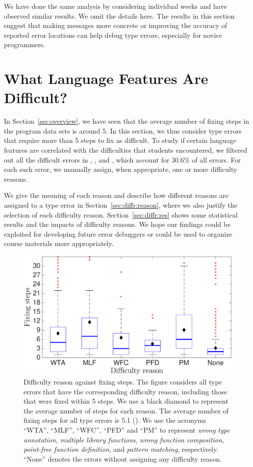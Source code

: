 \documentclass[12pt]{report}	%
\begin{document}
We have done the same analysis by considering individual
weeks and have observed similar results. We omit the
details here. The results in this section suggest
that making messages more concrete or 
improving the accuracy of reported error locations
can help debug type errors, especially for novice programmers.

\section{What Language Features Are Difficult?}
\label{sec:difficulty}

In Section~\ref{sec:overview}, we have seen that
the average number of fixing steps in the program data sets 
is around 5.
In this section, we thus
consider type errors that require 
more than 5 steps to fix
as difficult.
%
To study if certain language features are correlated with the
difficulties that students encountered, 
we filtered out all the difficult errors in \benchf, \benchs, and
\benchl, which account for 30.6\% of all errors.
%
For each such error, we manually assign, when appropriate, one
or more difficulty reasons.


We give the meaning of each reason and 
describe how different reasons are assigned 
to a type error in Section~\ref{sec:diffr:reason}, 
where we also justify the selection of each difficulty reason.
Section~\ref{sec:diffr:res} shows some statistical results 
and the impacts of difficulty reasons.
We hope our findings could be exploited
for developing future error debuggers
or could be used to organize course materials
more appropriately.

\begin{figure}
\centering
\includegraphics[width=0.85\columnwidth]{images/step_diffr.eps}
\caption{Difficulty reason against fixing steps.
The figure considers all type errors that have the corresponding
difficulty reason, including those that
were fixed within 5 steps.
%
We use a black diamond to represent the average number of steps for each reason.
The average number of fixing steps for all type errors is 5.1 ().
We use the acronyms ``WTA'', ``MLF'', ``WFC'', ``PFD'' and ``PM'' to represent \emph{wrong type annotation}, \emph{multiple library functions}, \emph{wrong function composition}, \emph{point-free function definition}, and \emph{pattern matching}, respectively. ``None'' denotes the errors without assigning any difficulty reason.}
\label{fig:diffr2}
\end{figure}
\end{document}
